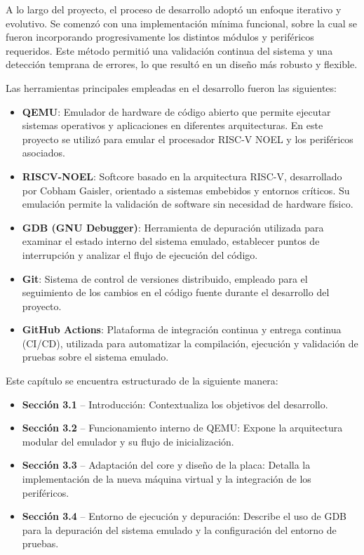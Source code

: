 A lo largo del proyecto, el proceso de desarrollo adoptó un enfoque iterativo y evolutivo. Se comenzó con una implementación mínima funcional, sobre la cual se fueron incorporando progresivamente los distintos módulos y periféricos requeridos. Este método permitió una validación continua del sistema y una detección temprana de errores, lo que resultó en un diseño más robusto y flexible.

Las herramientas principales empleadas en el desarrollo fueron las siguientes:

\begin{itemize}
  \item \textbf{QEMU}: Emulador de hardware de código abierto que permite ejecutar sistemas operativos y aplicaciones en diferentes arquitecturas. En este proyecto se utilizó para emular el procesador RISC-V NOEL y los periféricos asociados.
  \item \textbf{RISCV-NOEL}: Softcore basado en la arquitectura RISC-V, desarrollado por Cobham Gaisler, orientado a sistemas embebidos y entornos críticos. Su emulación permite la validación de software sin necesidad de hardware físico.
  \item \textbf{GDB (GNU Debugger)}: Herramienta de depuración utilizada para examinar el estado interno del sistema emulado, establecer puntos de interrupción y analizar el flujo de ejecución del código.
  \item \textbf{Git}: Sistema de control de versiones distribuido, empleado para el seguimiento de los cambios en el código fuente durante el desarrollo del proyecto.
  \item \textbf{GitHub Actions}: Plataforma de integración continua y entrega continua (CI/CD), utilizada para automatizar la compilación, ejecución y validación de pruebas sobre el sistema emulado.
\end{itemize}

Este capítulo se encuentra estructurado de la siguiente manera:

\begin{itemize}
  \item \textbf{Sección 3.1} – Introducción: Contextualiza los objetivos del desarrollo.
  \item \textbf{Sección 3.2} – Funcionamiento interno de QEMU: Expone la arquitectura modular del emulador y su flujo de inicialización.
  \item \textbf{Sección 3.3} – Adaptación del core y diseño de la placa: Detalla la implementación de la nueva máquina virtual y la integración de los periféricos.
  \item \textbf{Sección 3.4} – Entorno de ejecución y depuración: Describe el uso de GDB para la depuración del sistema emulado y la configuración del entorno de pruebas.
\end{itemize}

